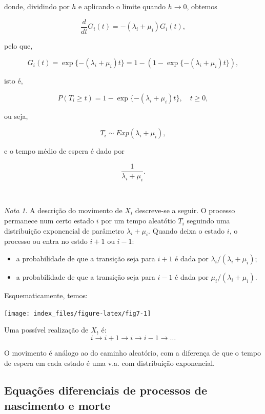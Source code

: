 \documentclass[
  11pt,
  a4paper,
]{book}
\theoremstyle{definition}
\theoremstyle{definition}
\theoremstyle{definition}
\theoremstyle{definition}
\theoremstyle{remark}
\newtheorem*{remark}{Nota }
\begin{document}
donde, dividindo por \(h\) e aplicando o limite quando \(h \to 0\), obtemos

\[\dfrac{d}{dt}G_i(t) = -(\lambda_i+\mu_i) G_i(t),\]

pelo que,

\[G_i(t) = \exp\{-(\lambda_i+\mu_i)t\} = 1-(1-\exp\{-(\lambda_i+\mu_i)t\}),\]

isto é,

\[P(T_i \geq t)=1-\exp\{-(\lambda_i+\mu_i)t\}, \quad t \geq 0,\]

ou seja,

\[\boxed{T_i \sim Exp(\lambda_i+\mu_i),}\]

e o tempo médio de espera é dado por

\[\dfrac{1}{\lambda_i+\mu_i}.\]

\(\,\)

\begin{remark}
A descrição do movimento de \(X_t\) descreve-se a seguir. O processo permanece num certo estado \(i\) por um tempo aleatótio \(T_i\) seguindo uma distribuição exponencial de parâmetro \(\lambda_i+\mu_i\). Quando deixa o estado \(i\), o processo ou entra no estdo \(i+1\) ou \(i-1\):

\begin{itemize}
\item
  a probabilidade de que a transição seja para \(i+1\) é dada por \(\lambda_i/(\lambda_i+\mu_i)\);
\item
  a probabilidade de que a transição seja para \(i-1\) é dada por \(\mu_i/(\lambda_i+\mu_i)\).
\end{itemize}

Esquematicamente, temos:

\begin{center}\texttt{[image: index\_files/figure-latex/fig7-1]} \end{center}

Uma possível realização de \(X_t\) é:
\[i \longrightarrow i+1 \longrightarrow i \longrightarrow i-1 \longrightarrow \dots\]

O movimento é análogo ao do caminho aleatório, com a diferença de que o tempo de espera em cada estado é uma v.a. com distribuição exponencial.
\end{remark}

\subsection{Equações diferenciais de processos de nascimento e morte}\label{equacoes-diferenciais-de-processos-de-nascimento-e-morte}
\end{document}
